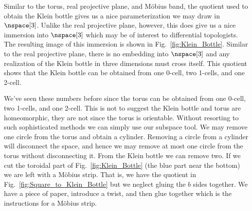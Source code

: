     \par\vspace{2.5ex}
    \begin{minipage}[t]{0.54\textwidth}
        Similar to the torus, real projective plane, and M\"{o}bius
        band, the quotient used to obtain the Klein bottle gives us a
        nice parameterization we may draw in $\nspace[3]$. Unlike the
        real projective plane, however, this does give us a nice
        immersion into $\nspace[3]$ which may be of interest to
        differential topologists. The resulting image of this immersion
        is shown in Fig.~\ref{fig:Klein_Bottle}. Similar to the real
        projective plane, there is no embedding into $\nspace[3]$ and
        any realization of the Klein bottle in three dimensions must
        cross itself. This quotient shows that the Klein bottle can be
        obtained from one 0-cell, two 1-cells, and one 2-cell.
    \end{minipage}
    \hfill
    \par\vspace{2.5ex}
    We've seen these numbers before since the torus can be obtained from
    one 0-cell, two 1-cells, and one 2-cell. This is not to suggest the
    Klein bottle and torus are homeomorphic, they are not since the
    torus is orientable. Without resorting to such sophisticated methods
    we can simply use our subspace tool. We may remove one circle from
    the torus and obtain a cylinder. Removing a circle from a cylinder
    will disconnect the space, and hence we may remove at most one
    circle from the torus without disconnecting it. From the Klein
    bottle we can remove two. If we cut the toroidal part of
    Fig.~\ref{fig:Klein_Bottle} (the blue part near the bottom) we are
    left with a M\"{o}bius strip. That is, we have the quotient in
    Fig.~\ref{fig:Square_to_Klein_Bottle} but we neglect gluing the
    $b$ sides together. We have a piece of paper, introduce a twist, and
    then glue together which is the instructions for a M\"{o}bius strip.
